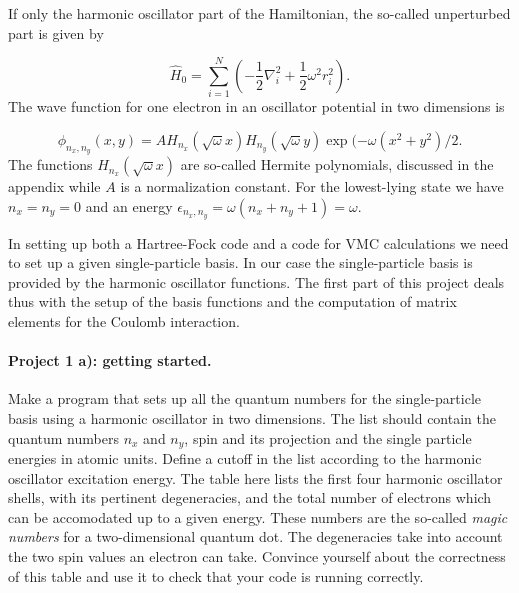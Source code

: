 \documentclass[%
oneside,                 %
final,                   %
10pt]{article}
\begin{document}
If only the harmonic oscillator part of the Hamiltonian,
the so-called unperturbed part is given by

\begin{equation*} \hat{H}_0=\sum_{i=1}^{N} \left(  -\frac{1}{2} \nabla_i^2 + \frac{1}{2} \omega^2r_i^2  \right).
\end{equation*}
The wave function for one electron in an oscillator potential in two dimensions is

\begin{equation*}
\phi_{n_x,n_y}(x,y) = A H_{n_x}(\sqrt{\omega}x)H_{n_y}(\sqrt{\omega}y)\exp{(-\omega(x^2+y^2)/2}.
\end{equation*}
The functions $H_{n_x}(\sqrt{\omega}x)$ are so-called Hermite polynomials, discussed in the appendix while $A$ is a normalization constant. 
For the lowest-lying state we have $n_x=n_y=0$ and an energy $\epsilon_{n_x,n_y}=\omega(n_x+n_y+1) = \omega$.

In setting up both a Hartree-Fock code and a code for VMC calculations we need to set up a given single-particle basis. In our case the single-particle basis is provided by the harmonic oscillator functions. The first part of this project deals thus with the setup of the basis functions and the computation of matrix elements for the Coulomb interaction. 

\paragraph{Project 1 a): getting started.}
Make a program that sets up all the quantum numbers for the single-particle basis using a harmonic oscillator in two dimensions. The list should contain the quantum numbers $n_x$ and $n_y$, spin and its projection and the single particle energies in atomic units. Define a cutoff in the list according to the harmonic oscillator excitation energy. The table here lists the first four harmonic oscillator shells, with its pertinent degeneracies, and the total number of electrons which can be accomodated up to a given energy. These numbers are the so-called \emph{magic numbers} for a two-dimensional quantum dot. The degeneracies take into account the two spin values an electron can take. Convince yourself about the correctness of this table and use it to check that your code is running correctly.
\end{document}
